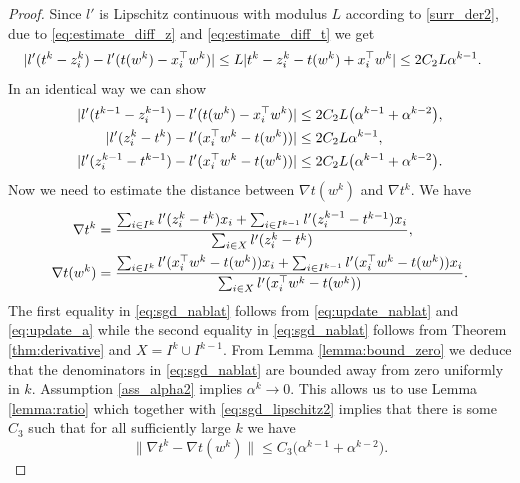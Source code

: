 \documentclass[]{interact}
\theoremstyle{plain}%
\theoremstyle{definition}
\theoremstyle{remark}
\newcommand{\norm}[1]{\|#1\|}
\newcommand{\nrm}[1]{|#1|}
\begin{document}
\begin{proof}
Since $l'$ is Lipschitz continuous with modulus $L$ according to \ref{surr_der2}, due to \eqref{eq:estimate_diff_z} and \eqref{eq:estimate_diff_t} we get
\begin{equation}\label{eq:sgd_lipschitz1}
\aligned
\nrm{l'(t^k-z_i^k) - l'(t(w^k)-x_i^\top w^k)}&\le L \nrm{t^k-z_i^k - t(w^k)+ x_i^\top w^k} \le  2C_2L\alpha^{k-1}.
\endaligned
\end{equation}
In an identical way we can show
\begin{equation}\label{eq:sgd_lipschitz2}
\aligned
\nrm{l'(t^{k-1}-z_i^{k-1}) - l'(t(w^k)-x_i^\top w^k)}& \le 2C_2L\big(\alpha^{k-1}+\alpha^{k-2}\big), \\
\nrm{l'(z_i^k-t^k) - l'(x_i^\top w^k-t(w^k))}&\le 2C_2L\alpha^{k-1}, \\
\nrm{l'(z_i^{k-1}-t^{k-1}) - l'(x_i^\top w^k-t(w^k))}& \le 2C_2L\big(\alpha^{k-1}+\alpha^{k-2}\big).
\endaligned
\end{equation}
Now we need to estimate the distance between $\nabla t(w^k)$ and $\nabla t^k$. We have
\begin{equation}\label{eq:sgd_nablat}
\aligned
\nabla t^k &= \frac{\sum_{i\in I^k}l'(z_i^k-t^k)x_i + \sum_{i\in I^{k-1}}l'(z_i^{k-1}-t^{k-1})x_i}{\sum_{i\in X}l'(z_i^k-t^k)}, \\
\nabla t(w^k) &= \frac{\sum_{i\in I^k}l'(x_i^\top w^k-t(w^k))x_i + \sum_{i\in I^{k-1}}l'(x_i^\top w^k-t(w^k))x_i
}{\sum_{i\in X}l'(x_i^\top w^k-t(w^k))}.
\endaligned
\end{equation}
The first equality in \eqref{eq:sgd_nablat} follows from \eqref{eq:update_nablat} and \eqref{eq:update_a} while the second equality in \eqref{eq:sgd_nablat} follows from Theorem \ref{thm:derivative} and $X=I^k\cup I^{k-1}$. From Lemma \ref{lemma:bound_zero} we deduce that the denominators in \eqref{eq:sgd_nablat} are bounded away from zero uniformly in $k$. Assumption \ref{ass_alpha2} implies  $\alpha^k\to 0$. This allows us to use Lemma \ref{lemma:ratio} which together with \eqref{eq:sgd_lipschitz2} implies that there is some $C_3$ such that for all sufficiently large $k$ we have
\begin{equation}\label{eq:sgd_nablat_diff}
\norm{\nabla t^k - \nabla t(w^k)}\le C_3\big(\alpha^{k-1} + \alpha^{k-2}\big).
\end{equation}


\end{proof}
\end{document}

